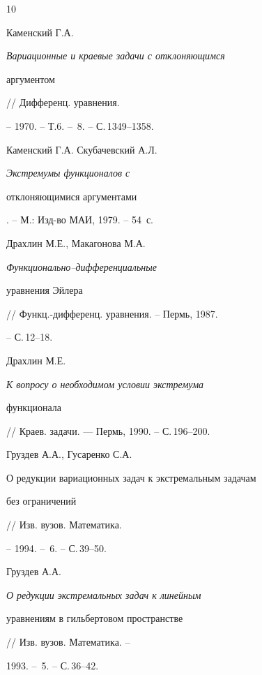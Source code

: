 \begin{thebibliography}{10}







Каменский Г.А. {\em Вариационные и краевые задачи с отклоняющимся


аргументом} // Дифференц. уравнения.


-- 1970. -- Т.6. -- \No\,8. -- С.\,1349--1358.







Каменский Г.А. Скубачевский А.Л. {\em Экстремумы функционалов с


отклоняющимися аргументами}. -- М.: Изд-во МАИ, 1979. -- 54~с.







Драхлин М.Е., Макагонова М.А. {\em Функционально--дифференциальные


уравнения Эйлера} // Функц.-дифференц. уравнения. -- Пермь, 1987.


-- С.\,12--18.







Драхлин М.Е. {\em К вопросу о необходимом условии экстремума


функционала} // Краев. задачи. --- Пермь, 1990. -- С.\,196--200.





 Груздев А.А., Гусаренко С.А. {\em


О редукции вариационных задач к экстремальным задачам


без ограничений} // Изв. вузов. Математика.


-- 1994. -- \No\,6. -- С.\,39--50.








 Груздев А.А. {\em О редукции экстремальных задач к линейным


уравнениям в гильбертовом пространстве} // Изв. вузов. Математика. --


1993. -- \No\,5. -- С.\,36--42.








\end{thebibliography}
